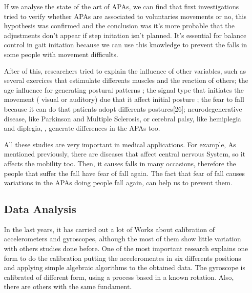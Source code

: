 If we analyse the state of the art of APAs, we can find that first investigations tried to verify whether APAs are associated to voluntaries movements or no,  this hypothesis was confirmed and the conclusion was it’s more probable that the adjustments don’t appear if step initation isn’t planned. It’s essential for balance control in gait initation because we can use this knowledge to prevent the falls in some people with movement difficults.\cite{Mcllroy1993}\cite{Yiou2012}\cite{Teddy2013}\cite{Bouisset2008}\cite{Neeta2014}

After of this, researchers tried to explain the influence of other variables, such as several exercices that estimulate differents muscles and the reaction of others\cite{Gay2011}; the age influence for generating postural patterns \cite{Bleuse2006} \cite{Estelle2008}; the signal type that initiates the movement ( visual or auditory) due that it affect initial posture \cite{Mcllroy1993}\cite{Antonia2009}\cite{Vicent1999}\cite{Tard2013}; the fear to fall because it can do that patients adopt differents postures[26]; neurodegenerative disease, like Parkinson and Multiple Sclerosis\cite{Mancini2009}\cite{Jebb2008}\cite{Chris2005}\cite{Hall2013}, or cerebral palsy, like hemiplegia and diplegia, \cite{Hall2013}, generate differences in the APAs too.

All these studies are very important in medical applications. For example, As mentioned previously, there are diseases that affect central nervous System, so it affects  the mobility too. Then, it causes falls in many occasions, therefore  the people that suffer the fall have fear of fall again. The fact that fear of fall causes variations in the APAs doing people  fall again, can help us to prevent them.

\subsection{Data Analysis}

In the last years, it has carried out a lot of Works about  calibration of accelerometers and gyroscopes, although the most of them show little variation with others studies done before. One of the most important research  \cite{Kian2011}explains one form to do the calibration putting the acceleromentes in six differents positions and applying  simple algebraic algorithms to the obtained data. The gyroscope is calibrated of different form, using a process based in a known rotation. Also, there are others with the same fundament.

